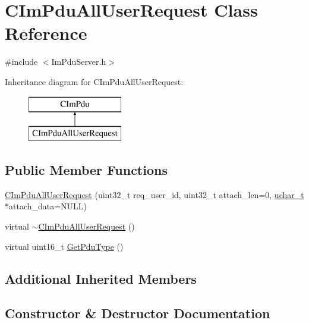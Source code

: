 \hypertarget{class_c_im_pdu_all_user_request}{}\section{C\+Im\+Pdu\+All\+User\+Request Class Reference}
\label{class_c_im_pdu_all_user_request}


{\ttfamily \#include $<$Im\+Pdu\+Server.\+h$>$}

Inheritance diagram for C\+Im\+Pdu\+All\+User\+Request\+:\begin{figure}[H]
\begin{center}
\leavevmode
\includegraphics[height=2.000000cm]{class_c_im_pdu_all_user_request}
\end{center}
\end{figure}
\subsection*{Public Member Functions}
\begin{DoxyCompactItemize}
\item 
\hyperlink{class_c_im_pdu_all_user_request_a843a2a3b4c568fcfff4cc38cf4bea4de}{C\+Im\+Pdu\+All\+User\+Request} (uint32\+\_\+t req\+\_\+user\+\_\+id, uint32\+\_\+t attach\+\_\+len=0, \hyperlink{base_2ostype_8h_a124ea0f8f4a23a0a286b5582137f0b8d}{uchar\+\_\+t} $\ast$attach\+\_\+data=N\+U\+L\+L)
\item 
virtual \hyperlink{class_c_im_pdu_all_user_request_aba3fc271eb7c45431315c6d9e4c8be69}{$\sim$\+C\+Im\+Pdu\+All\+User\+Request} ()
\item 
virtual uint16\+\_\+t \hyperlink{class_c_im_pdu_all_user_request_a8f59b2ae07282bffe43f9e0dde225498}{Get\+Pdu\+Type} ()
\end{DoxyCompactItemize}
\subsection*{Additional Inherited Members}


\subsection{Constructor \& Destructor Documentation}
\hypertarget{class_c_im_pdu_all_user_request_a843a2a3b4c568fcfff4cc38cf4bea4de}{}
